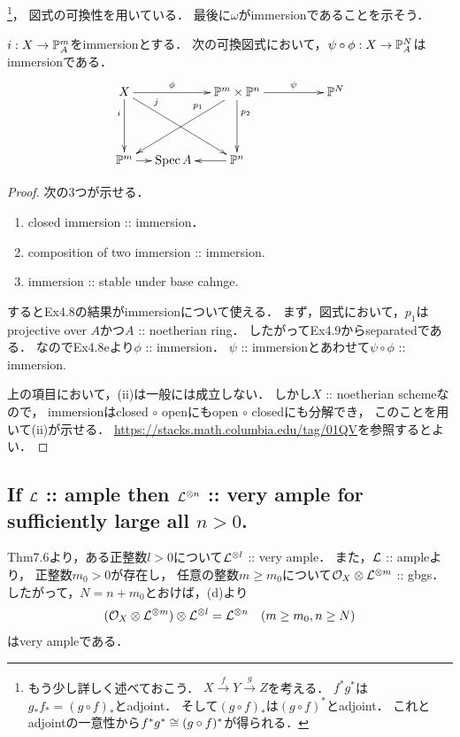 \documentclass[a4paper]{jsarticle}
\begin{document}
    \footnote
        {
            もう少し詳しく述べておこう．
            $X \xrightarrow{f} Y \xrightarrow{g} Z$を考える．
            $f^* g^*$は$g_* f_*=(g \circ f)_*$とadjoint．
            そして$(g \circ f)_*$は$(g \circ f)^*$とadjoint．
            これとadjointの一意性から$f^* g^* \cong (g \circ f)^*$が得られる．
        }，
    図式の可換性を用いている．
    最後に$\omega$がimmersionであることを示そう．
    \begin{Claim}
        $i: X \to \mathbb{P}^m_A$をimmersionとする．
        次の可換図式において，$\psi \circ \phi: X \to \mathbb{P}^N_A$はimmersionである．
        \[ 
        \xymatrix@C=12pt@R=40pt
        {
            X \ar[d]_(.3){i}\ar[rrd]^(.25){j}\ar[rr]^-{\phi}&
                {} &
                \proj^m \times \proj^n \ar[lld]_(.3){p_1}\ar[d]^(.3){p_2}\ar[rrr]^-{\psi}&
                {} &
                {} &
                \proj^N \\
            \proj^m \ar[r]& \Spec A &\ar[l] \proj^n & {} & {}
        }
        \]
    \end{Claim}
    \begin{proof}
        次の3つが示せる．
        \begin{enumerate}[label=(\roman*)]
            \item closed immersion :: immersion．
            \item composition of two immersion :: immersion.
            \item immersion :: stable under base cahnge.
        \end{enumerate}
        するとEx4.8の結果がimmersionについて使える．
        まず，図式において，$p_1$はprojective over $A$かつ$A$ :: noetherian ring．
        したがってEx4.9からseparatedである．
        なのでEx4.8eより$\phi$ :: immersion．
        $\psi$ :: immersionとあわせて$\psi \circ \phi$ :: immersion.
        
        上の項目において，(ii)は一般には成立しない．
        しかし$X$ :: noetherian schemeなので，
        immersionはclosed $\circ$ openにもopen $\circ$ closedにも分解でき，
        このことを用いて(ii)が示せる．
        \url{https://stacks.math.columbia.edu/tag/01QV}を参照するとよい．
    \end{proof}

    \subsection{If $\mathcal{L}$ :: ample then $\mathcal{L}^{\otimes n}$ :: very ample for sufficiently large all $n>0$.}
    Thm7.6より，ある正整数$l>0$について$\mathcal{L}^{\otimes l}$ :: very ample．
    また，$\mathcal{L}$ :: ampleより，
    正整数$m_0>0$が存在し，
    任意の整数$m \geq m_0$について$\mathcal{O}_X \otimes \mathcal{L}^{\otimes m}$ :: gbgs．
    したがって，$N=n+m_0$とおけば，(d)より
    \[ (\mathcal{O}_X \otimes \mathcal{L}^{\otimes m}) \otimes \mathcal{L}^{\otimes l}=\mathcal{L}^{\otimes n} ~~~ (m \geq m_0, n \geq N) \]
    はvery ampleである．
\end{document}
